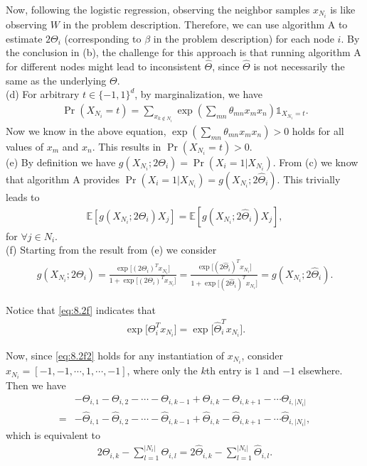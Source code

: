 \documentclass{article}
\newcommand{\qeds}{\hfill\qedsymbol}
\begin{document}
Now, following the logistic regression, observing the neighbor samples $x_{N_i}$ is like observing
$W$ in the problem description. Therefore, we can use algorithm A to estimate $2\Theta_i$
(corresponding to $\beta$ in the problem description) for each node $i$.
By the conclusion in (b), the challenge for this approach is that running algorithm A for different nodes
might lead to inconsistent $\hat{\Theta}$, since $\hat{\Theta}$ is not necessarily the same as the underlying
$\Theta$.
\\

\noindent
(d)
%
For arbitrary $t\in\{-1, 1\}^d$, by marginalization, we have
\begin{align*}
	\Pr(X_{N_i} = t) = \sum_{x_{k \notin N_i}}\exp\left(\sum_{mn}\theta_{mn} x_m x_n\right)
	\mathds{1}_{X_{N_i}=t}.
\end{align*}
Now we know in the above equation, $\exp\left(\sum_{mn}\theta_{mn} x_m x_n\right) > 0$ holds for all values of
$x_m$ and $x_n$. This results in $\Pr(X_{N_i} = t) > 0$. \qeds
\\

\noindent
(e)
%
By definition we have $g(X_{N_i}; 2\Theta_i) = \Pr(X_i=1|X_{N_i})$. From (c) we know that algorithm A provides
$\Pr(X_i=1|X_{N_i}) = g(X_{N_i}; 2\hat{\Theta}_i)$. This trivially leads to 
\begin{align*}
	\mathbb{E}[g(X_{N_i}; 2\Theta_i) X_j] = 	\mathbb{E}[g(X_{N_i}; 2\hat{\Theta}_i) X_j],
\end{align*}
for $\forall j \in N_i$. \qeds
\\

\noindent
(f) Starting from the result from (e) we consider
\begin{align}
	g(X_{N_i}; 2\Theta_i) = \frac{\exp\big[(2\Theta_i)^T x_{N_i}\big]}
{1 + \exp\big[(2\Theta_i)^T x_{N_i}\big]} = \frac{\exp\big[(2\hat{\Theta}_i)^T x_{N_i}\big]}
{1 + \exp\big[(2\hat{\Theta}_i)^T x_{N_i}\big]} = g(X_{N_i}; 2\hat{\Theta}_i). \label{eq:8.2f}
\end{align}
%

Notice that \eqref{eq:8.2f} indicates that
\begin{align}
	\exp\big[\Theta_i^T x_{N_i}\big] = \exp\big[\hat{\Theta}_i^T x_{N_i}\big]. \label{eq:8.2f2}
\end{align}

Now, since \eqref{eq:8.2f2} holds for any instantiation of $x_{N_i}$, consider $x_{N_i} = [-1, -1, \cdots, 1, \cdots, -1]$, where only the $k$th entry is $1$ and $-1$ elsewhere. Then we have
\begin{align*}
	&-\Theta_{i, 1} - \Theta_{i, 2} - \cdots - \Theta_{i, k-1} + \Theta_{i, k} - \Theta_{i, k+1} - \cdots \Theta_{i, |N_i|}\\
	= &-\hat{\Theta}_{i, 1} - \hat{\Theta}_{i, 2} - \cdots - \hat{\Theta}_{i, k-1} + \hat{\Theta}_{i, k} - \hat{\Theta}_{i, k+1} - \cdots \hat{\Theta}_{i, |N_i|},
\end{align*}
%
which is equivalent to
\begin{align}
	2 \Theta_{i, k} - \sum_{l=1}^{|N_i|}\Theta_{i, l} = 2 \hat{\Theta}_{i, k} - \sum_{l=1}^{|N_i|}\hat{\Theta}_{i, l}. \label{eq:82f3}
\end{align}
\end{document}
